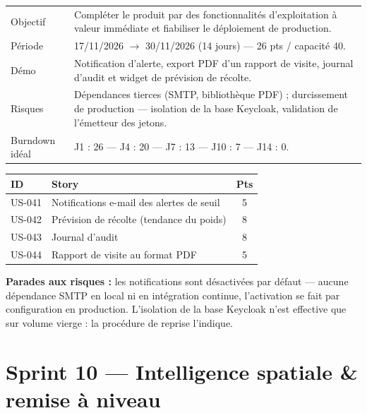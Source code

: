 \begin{center}
\begin{tabular}{lp{11cm}}
\toprule
Objectif  & Compléter le produit par des fonctionnalités d'exploitation à
            valeur immédiate et fiabiliser le déploiement de production. \\
Période   & 17/11/2026 $\rightarrow$ 30/11/2026 (14 jours) --- 26 pts / capacité 40. \\
Démo      & Notification d'alerte, export PDF d'un rapport de visite, journal
            d'audit et widget de prévision de récolte. \\
Risques   & Dépendances tierces (SMTP, bibliothèque PDF) ; durcissement de
            production --- isolation de la base Keycloak, validation de
            l'émetteur des jetons. \\
Burndown idéal & J1 : 26 --- J4 : 20 --- J7 : 13 --- J10 : 7 --- J14 : 0. \\
\bottomrule
\end{tabular}
\end{center}

\begin{center}
\begin{tabular}{lp{9cm}c}
\toprule
\textbf{ID} & \textbf{Story} & \textbf{Pts} \\
\midrule
US-041 & Notifications e-mail des alertes de seuil & 5 \\
US-042 & Prévision de récolte (tendance du poids)  & 8 \\
US-043 & Journal d'audit                           & 8 \\
US-044 & Rapport de visite au format PDF           & 5 \\
\bottomrule
\end{tabular}
\end{center}

\textbf{Parades aux risques :} les notifications sont désactivées par défaut
--- aucune dépendance SMTP en local ni en intégration continue, l'activation
se fait par configuration en production. L'isolation de la base Keycloak
n'est effective que sur volume vierge : la procédure de reprise l'indique.

\section{Sprint 10 --- Intelligence spatiale \& remise à niveau}

